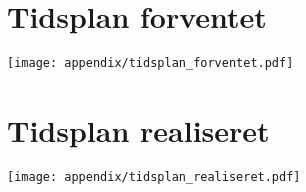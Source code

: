 \section{Tidsplan forventet} \label{sec:tidsplan_forventet}
\texttt{[image: appendix/tidsplan\_forventet.pdf]}
\section{Tidsplan realiseret} \label{sec:tidsplan_realiseret}
\texttt{[image: appendix/tidsplan\_realiseret.pdf]}